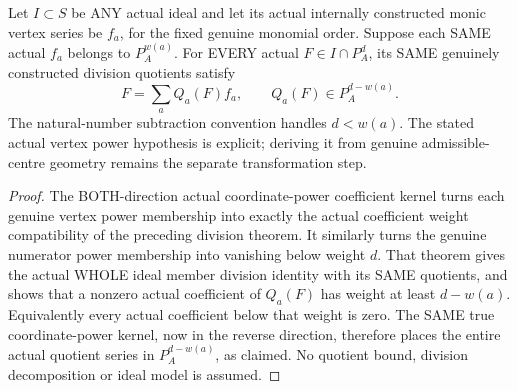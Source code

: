 \begin{theorem}
\label{hir:actual-formal-centre-power-whole-division-membership}
Let $I\subset S$ be ANY actual ideal and let its actual internally
constructed monic vertex series be $f_a$, for the fixed genuine monomial
order. Suppose each SAME actual $f_a$ belongs to $P_A^{w(a)}$.
For EVERY actual $F\in I\cap P_A^d$, its SAME genuinely constructed
division quotients satisfy
\[
 F=\sum_aQ_a(F)f_a,\qquad Q_a(F)\in P_A^{d-w(a)}.
\]
The natural-number subtraction convention handles $d<w(a)$. The stated
actual vertex power hypothesis is explicit; deriving it from genuine
admissible-centre geometry remains the separate transformation step.
\leanok
\end{theorem}
\begin{proof}
The BOTH-direction actual coordinate-power coefficient kernel turns
each genuine vertex power membership into exactly the actual coefficient
weight compatibility of the preceding division theorem. It similarly
turns the genuine numerator power membership into vanishing below
weight $d$. That theorem gives the actual WHOLE ideal member division
identity with its SAME quotients, and shows that a nonzero actual
coefficient of $Q_a(F)$ has weight at least $d-w(a)$. Equivalently
every actual coefficient below that weight is zero. The SAME true
coordinate-power kernel, now in the reverse direction, therefore
places the entire actual quotient series in $P_A^{d-w(a)}$, as claimed.
No quotient bound, division decomposition or ideal model is assumed.
\end{proof}
